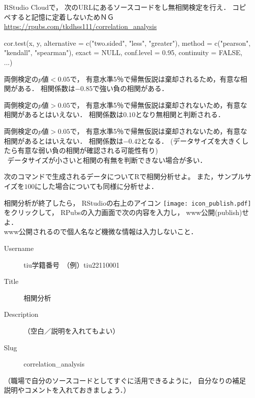 {
  RStudio Cloudで，
  次のURLにあるソースコードをし無相関検定を行え．
  \alert{コピペすると記憶に定着しないためＮＧ}
  \url{https://rpubs.com/tkdhss111/correlation_analysis}
}

\MyFrame{}
{
}

\MyFrame{}
{
}

\MyFrame{}
{
}

\MyFrame{}
{
}

{
  \footnotesize
  cor.test(x, y, alternative = c("two.sided", "less", "greater"), method = c("pearson", "kendall", "spearman"), exact = NULL, conf.level = 0.95, continuity = FALSE, ...)
}

\MyFrame{}
{
  両側検定の$p$値$<0.05$で，
  有意水準5％で帰無仮説は棄却されるため，有意な相関がある．
  相関係数は$-0.85$で強い負の相関がある．
}

\MyFrame{}
{
  両側検定の$p$値$>0.05$で，
  有意水準5％で帰無仮説は棄却されないため，有意な相関があるとはいえない．
  相関係数は$0.10$となり無相関と判断される．
}

\MyFrame{}
{
  両側検定の$p$値$>0.05$で，
  有意水準5％で帰無仮説は棄却されないため，有意な相関があるとはいえない．
  相関係数は$-0.42$となる．
  (データサイズを大きくしたら有意な弱い負の相関が確認される可能性有り)\\
  \pause
  \alert{\ra~データサイズが小さいと相関の有無を判断できない場合が多い．}
}

{
  次のコマンドで生成されるデータについてRで相関分析せよ。
  また，サンプルサイズを$100$にした場合についても同様に分析せよ．
}

{
  相関分析が終了したら，
  RStudioの右上のアイコン
  \texttt{[image: icon\_publish.pdf]}をクリックして，
  RPubsの入力画面で次の内容を入力し，
  www公開(publish)せよ．\\
  \alert{www公開されるので個人名など機微な情報は入力しないこと．}
  \begin{description}
    \item[Username] tiu学籍番号　（例）tiu22110001\\
    \item[Title] 相関分析\\
    \item[Description] （空白／説明を入れてもよい）\\
    \item[Slug] correlation\_analysis
  \end{description}
  （職場で自分のソースコードとしてすぐに活用できるように，
    自分なりの補足説明やコメントを入れておきましょう．）
}

